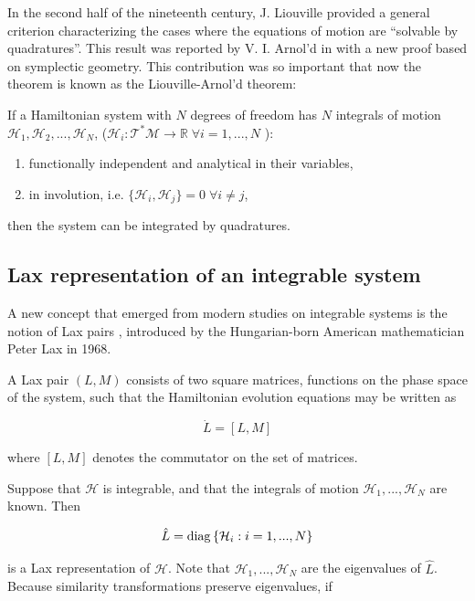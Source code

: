 In the second half of the nineteenth century, J. Liouville \cite{liouville1855} provided a general criterion characterizing the cases where the equations of motion are ``solvable by quadratures''. This result was reported by V. I. Arnol'd in \cite{arnold1997} with a new proof based on symplectic geometry. This contribution was so important that now the theorem is known as the Liouville-Arnol'd theorem:

\begin{thm}
If a Hamiltonian system with $N$ degrees of freedom has $N$ integrals of motion $\mathcal{H}_1, \mathcal{H}_2, ..., \mathcal{H}_N$, ($\mathcal{H}_i:\mathcal{T}^\ast \mathcal{M} \to \mathbb{R}\;\forall i = 1,...,N$ ):
\begin{enumerate}
\item functionally independent and analytical in their variables,
\item in involution, i.e. $\{\mathcal{H}_i, \mathcal{H}_j\} = 0 \;\forall i \neq j$,
\end{enumerate}
then the system can be integrated by quadratures.
\end{thm}

\subsection{Lax representation of an integrable system}
A new concept that emerged from modern studies on integrable systems is the notion of Lax pairs \cite{lax1968}, introduced by the Hungarian-born American mathematician Peter Lax in 1968.

\begin{defi}
A Lax pair $(L,M)$ consists of two square matrices, functions on the phase space of the system, such that the Hamiltonian evolution equations may be written as

\begin{equation}\label{laxevolution}
\dot L = [L, M]
\end{equation}

where $[L,M]$ denotes the commutator on the set of matrices. 
\end{defi}

Suppose that $\mathcal{H}$ is integrable, and that the integrals of motion $\mathcal{H}_1, ..., \mathcal{H}_N$ are known. Then

\[ \hat L = \mathop{\mathrm{diag}}{ \{\mathcal{H}_i : i=1,...,N \}} \]

is a Lax representation of $\mathcal{H}$. Note that $\mathcal{H}_1, ..., \mathcal{H}_N$ are the eigenvalues of $\hat L$. \\
Because similarity transformations preserve eigenvalues, if

